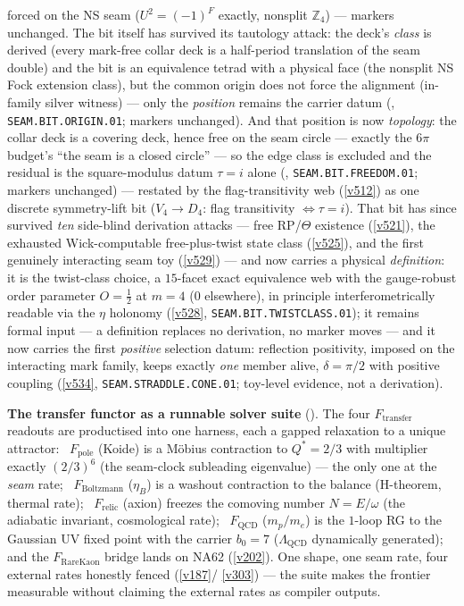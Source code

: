 \documentclass[11pt,a4paper]{article}
\newcommand{\Z}{\mathbb Z}
\begin{document}
forced on the NS seam ($U^2=(-1)^F$ exactly, nonsplit $\Z_4$) --- markers unchanged. The bit itself
has survived its tautology attack: the deck's \emph{class} is derived (every mark-free collar deck is
a half-period translation of the seam double) and the bit is an equivalence tetrad with a physical
face (the nonsplit NS Fock extension class), but the common origin does not force the alignment
(in-family silver witness) --- only the \emph{position} remains the carrier datum
(, \texttt{SEAM.BIT.ORIGIN.01}; markers unchanged). And that
position is now \emph{topology}: the collar deck is a covering deck, hence free on the seam circle
--- exactly the $6\pi$ budget's ``the seam is a closed circle'' --- so the edge class is excluded
and the residual is the square-modulus datum $\tau=i$ alone
(, \texttt{SEAM.BIT.FREEDOM.01}; markers unchanged) ---
restated by the flag-transitivity web (\vref{v512}) as one discrete symmetry-lift bit
($V_4\to D_4$: flag transitivity $\iff\tau=i$). That bit has since survived \emph{ten}
side-blind derivation attacks --- free RP/$\Theta$ existence (\vref{v521}), the exhausted
Wick-computable free-plus-twist state class (\vref{v525}), and the first genuinely interacting
seam toy (\vref{v529}) --- and now carries a physical \emph{definition}: it is the twist-class
choice, a $15$-facet exact equivalence web with the gauge-robust order parameter $O=\tfrac12$
at $m=4$ ($0$ elsewhere), in principle interferometrically readable via the $\eta$ holonomy
(\vref{v528}, \texttt{SEAM.BIT.TWISTCLASS.01}); it remains formal input --- a definition
replaces no derivation, no marker moves --- and it now carries the first \emph{positive}
selection datum: reflection positivity, imposed on the interacting mark family, keeps exactly
\emph{one} member alive, $\delta=\pi/2$ with positive coupling
(\vref{v534}, \texttt{SEAM.STRADDLE.CONE.01}; toy-level evidence, not a derivation).

\par\smallskip\noindent\textbf{The transfer functor as a runnable solver suite}
(). The four $F_{\mathrm{transfer}}$ readouts are productised into one harness, each
a gapped relaxation to a unique attractor: \mE\ $F_{\mathrm{pole}}$ (Koide) is a M\"obius contraction to
$Q^*{=}2/3$ with multiplier exactly $(2/3)^6$ (the seam-clock subleading eigenvalue) --- the only one at the
\emph{seam} rate; \mC\ $F_{\mathrm{Boltzmann}}$ ($\eta_B$) is a washout contraction to the balance (H-theorem,
thermal rate); \mC\ $F_{\mathrm{relic}}$ (axion) freezes the comoving number $N{=}E/\omega$ (the adiabatic
invariant, cosmological rate); \mE\ $F_{\mathrm{QCD}}$ ($m_p/m_e$) is the $1$-loop RG to the Gaussian UV fixed
point with the carrier $b_0{=}7$ ($\Lambda_{\mathrm{QCD}}$ dynamically generated); and the $F_{\mathrm{RareKaon}}$
bridge lands on NA62 (\vref{v202}). One shape, one seam rate, four external rates honestly fenced (\vref{v187}/
\vref{v303}) --- the suite makes the frontier measurable without claiming the external rates as compiler outputs.
\end{document}

